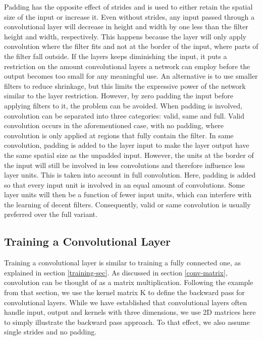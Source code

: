 Padding has the opposite effect of strides and is used to either retain the spatial size of the input or increase it. Even without strides, any input passed through a convolutional layer will decrease in height and width by one less than the filter height and width, respectively. This happens because the layer will only apply convolution where the filter fits and not at the border of the input, where parts of the filter fall outside. If the layers keeps diminishing the input, it puts a restriction on the amount convolutional layers a network can employ before the output becomes too small for any meaningful use. An alternative is to use smaller filters to reduce shrinkage, but this limits the expressive power of the network similar to the layer restriction. However, by zero padding the input before applying filters to it, the problem can be avoided. When padding is involved, convolution can be separated into three categories: valid, same and full. Valid convolution occurs in the aforementioned case, with no padding, where convolution is only applied at regions that fully contain the filter. In same convolution, padding is added to the layer input to make the layer output have the same spatial size as the unpadded input. However, the units at the border of the input will still be involved in less convolutions and therefore influence less layer units. This is taken into account in full convolution. Here, padding is added so that every input unit is involved in an equal amount of convolutions. Some layer units will then be a function of fewer input units, which can interfere with the learning of decent filters. Consequently, valid or same convolution is usually preferred over the full variant.

\subsection{Training a Convolutional Layer}

Training a convolutional layer is similar to training a fully connected one, as explained in section \ref{training-sec}. As discussed in section \ref{conv-matrix}, convolution can be thought of as a matrix multiplication. Following the example from that section, we use the kernel matrix K to define the backward pass for convolutional layers. While we have established that convolutional layers often handle input, output and kernels with three dimensions, we use 2D matrices here to simply illustrate the backward pass approach. To that effect, we also assume single strides and no padding. 

